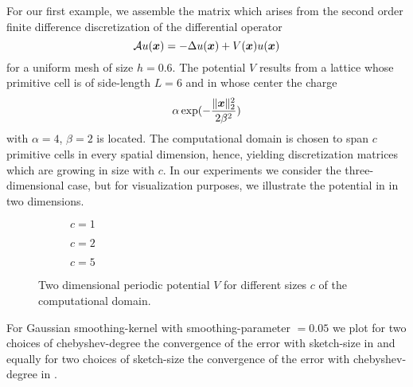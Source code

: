 For our first example, we assemble the matrix which arises from the second order
finite difference discretization of the differential operator
\begin{equation}
    \mathcal{A} u(\boldsymbol{x}) = - \Delta u(\boldsymbol{x}) + V(\boldsymbol{x}) u(\boldsymbol{x})
    \label{equ:5-experiments-electronic-hamiltonian}
\end{equation}
for a uniform mesh of size $h=0.6$. The potential $V$ results from a
lattice whose primitive cell is of side-length $L=6$ and in whose center the
charge
\begin{equation}
    \alpha \exp(-\frac{\lVert \boldsymbol{x} \rVert _2^2}{ 2 \beta^2 })
    \label{equ:5-experiments-gaussian-cell}
\end{equation}
with $\alpha = 4$, $\beta = 2$ is located. The computational domain is chosen
to span $c$ primitive cells in every spatial dimension, hence, yielding
discretization matrices which are growing in size with $c$. In our experiments
we consider the three-dimensional case, but for visualization purposes, we
illustrate the potential in 
in two dimensions.\\
\begin{figure}[ht]
    \begin{subfigure}[b]{0.32\columnwidth}
        
        \caption{$c=1$}
        \label{fig:5-experiments-periodic-gaussian-well-1}
    \end{subfigure}
    \begin{subfigure}[b]{0.32\columnwidth}
        
        \caption{$c=2$}
        \label{fig:5-experiments-periodic-gaussian-well-2}
    \end{subfigure}
    \begin{subfigure}[b]{0.32\columnwidth}
        
        \caption{$c=5$}
        \label{fig:5-experiments-periodic-gaussian-well-5}
    \end{subfigure}
    \caption{Two dimensional periodic potential $V$ for different sizes $c$ of the computational domain.}
    \label{fig:5-experiments-periodic-gaussian-well}
\end{figure}

For Gaussian \gls{smoothing-kernel} 
with \gls{smoothing-parameter} $=0.05$ we plot for two choices of \gls{chebyshev-degree}
the convergence of the error with \gls{sketch-size} in 
and equally for two choices of \gls{sketch-size} the convergence of the
error with \gls{chebyshev-degree} in .


